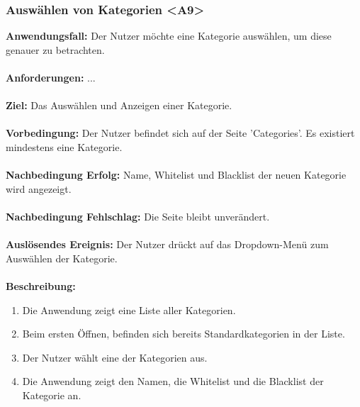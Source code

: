 \documentclass[parskip=full]{scrartcl} %
\begin{document}
\subsubsection*{Auswählen von Kategorien <A9>}
\textbf{Anwendungsfall:} Der Nutzer möchte eine Kategorie auswählen, um diese genauer zu betrachten.\\\\
\textbf{Anforderungen:} ...\\\\
\textbf{Ziel:} Das Auswählen und Anzeigen einer Kategorie. \\\\
\textbf{Vorbedingung:} Der Nutzer befindet sich auf der Seite 'Categories'. Es existiert mindestens eine Kategorie. \\\\
\textbf{Nachbedingung Erfolg:} Name, Whitelist und Blacklist der neuen Kategorie wird angezeigt.\\\\
\textbf{Nachbedingung Fehlschlag:} Die Seite bleibt unverändert.\\\\
\textbf{Auslösendes Ereignis:} Der Nutzer drückt auf das Dropdown-Menü zum Auswählen der Kategorie. \\\\
\textbf{Beschreibung:}
\begin{enumerate}
    \item Die Anwendung zeigt eine Liste aller Kategorien.
    \item Beim ersten Öffnen, befinden sich bereits Standardkategorien in der Liste.
    \item Der Nutzer wählt eine der Kategorien aus.
    \item Die Anwendung zeigt den Namen, die Whitelist und die Blacklist der Kategorie an.
\end{enumerate}
\newpage
\end{document}
